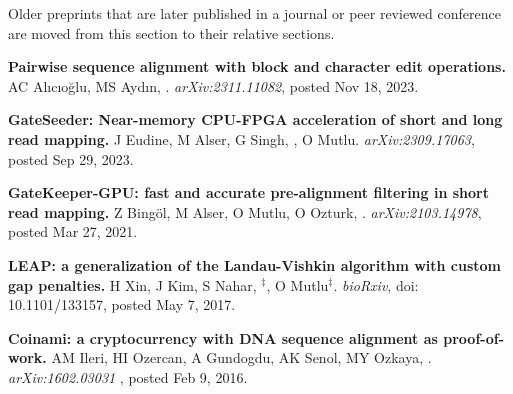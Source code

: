 \small{
Older preprints that are later published in a journal or peer reviewed conference are moved from this section to their relative sections.
}

\vspace{-.2cm}
{\bf Pairwise sequence alignment with block and character edit operations.} AC Alıcıoğlu, MS Aydın, \calkan{}.
{\it arXiv:2311.11082}, posted Nov 18, 2023.

\vspace{-.2cm}
{\bf GateSeeder: Near-memory CPU-FPGA acceleration of short and long read mapping.}
J Eudine, M Alser, G Singh, \calkan{}, O Mutlu.
{\it arXiv:2309.17063}, posted Sep 29, 2023.




\vspace{-.2cm}
{\bf GateKeeper-GPU: fast and accurate pre-alignment filtering in short read mapping.}
Z Bingöl, M Alser, O Mutlu, O Ozturk, \calkan{}.
{\it arXiv:2103.14978}, posted Mar 27, 2021.




\vspace{-.2cm}
 {\bf LEAP: a generalization of the Landau-Vishkin algorithm with custom gap penalties.}
 H Xin, J Kim, S Nahar, \calkan{}$^\ddag$, O Mutlu$^\ddag$.
{\it bioRxiv}, doi: 10.1101/133157, posted May 7, 2017.

\vspace{-.2cm}
 {\bf  Coinami: a cryptocurrency with DNA sequence alignment as proof-of-work.}
 AM Ileri, HI Ozercan, A Gundogdu, AK Senol, MY Ozkaya, \calkan{}.
{\it arXiv:1602.03031} , posted Feb 9, 2016.


\vspace{-.4cm}

